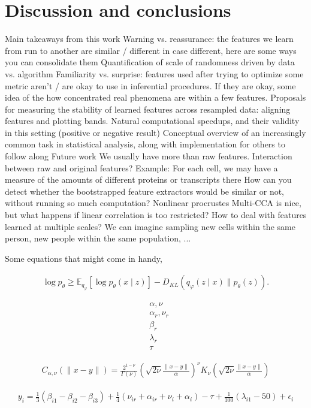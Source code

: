 \documentclass[11pt]{article}
\begin{document}
\section{Discussion and conclusions}

\begin{outline}
  \1 Main takeaways from this work
    \2 Warning vs. reassurance: the features we learn from run to another are
    similar / different
      \3 in case different, here are some ways you can consolidate them
      \3 Quantification of scale of randomness driven by data vs. algorithm
    \2 Familiarity vs. surprise: features used after trying to optimize some
    metric aren't / are okay to use in inferential procedures. If they are okay,
    some idea of the how concentrated real phenomena are within a few features.
    \2 Proposals for measuring the stability of learned features across
    resampled data: aligning features and plotting bands.
    \2 Natural computational speedups, and their validity in this setting
    (positive or negative result)
    \2 Conceptual overview of an increasingly common task in statistical
    analysis, along with implementation for others to follow along
  \1 Future work
    \2 We usually have more than raw features. Interaction between raw and
    original features?
      \3 Example: For each cell, we may have a measure of the amounts of
      different proteins or transcripts there
    \2 How can you detect whether the bootstrapped feature extractors would be
    similar or not, without running so much computation?
    \2 Nonlinear procrustes
      \3 Multi-CCA is nice, but what happens if linear correlation is too
      restricted?
    \2 How to deal with features learned at multiple scales? We can imagine
    sampling new cells within the same person, new people within the same
    population, ...
\end{outline}

Some equations that might come in handy,

\begin{align}
  \log p_{\theta} \geq  \mathbb{E}_{q_{\varphi}}\left[\log p_{\theta}(x \mid z)\right]-D_{KL}\left(q_{\varphi}(z \mid x) \| p_{\theta}(z)\right).
\end{align}

\begin{align}
&\alpha, \nu \\
&\alpha_{r}, \nu_{r} \\
&\beta_{r} \\
&\lambda_{r} \\
&\tau
\end{align}

\begin{align}
C_{\alpha, \nu}(\|x-y\|)= \frac{2^{1-\nu}}{\Gamma(\nu)}\left(\sqrt{2 \nu} \frac{\|x-y\|}{\alpha}\right)^{\nu} K_{\nu}\left(\sqrt{2 \nu} \frac{\|x-y\|}{\alpha}\right)
\end{align}

\begin{align}
y_{i}=\frac{1}{3}\left(\beta_{i1}-\beta_{i2}-\beta_{i3}\right)+\frac{1}{4}\left(\nu_{ir}+\alpha_{ir}+\nu_i+\alpha_i\right)-\tau+\frac{1}{100}\left(\lambda_{i1}-50\right)+\epsilon_{i}
\end{align}



\end{document}
